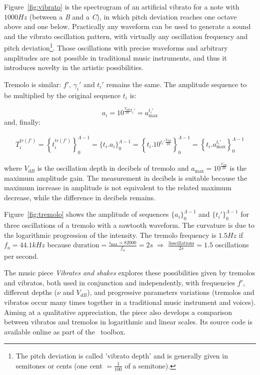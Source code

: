 Figure~\ref{fig:vibrato} is the spectrogram of an artificial vibrato for a note with $1000Hz$ (between a \emph{B} and a \emph{C}), in which pitch deviation reaches one octave above and one below. Practically any waveform can be used to generate a sound and the vibrato oscillation pattern, with virtually any oscillation frequency and pitch deviation\footnote{The pitch deviation is called 'vibrato depth' and is generally given in semitones or cents (one cent $= \frac{1}{100}$ of a semitone).}.
Those oscillations with precise waveforms and arbitrary amplitudes are not possible in traditional music instruments, and thus it introduces novelty in the artistic possibilities.

Tremolo is similar: $f'$, $\gamma_i'$ and $t_i'$ remains the same.
The amplitude sequence to be multiplied by the original sequence $t_i$ is:

\begin{equation}\label{trA}
 a_i=10^{\frac{V_{dB}}{20}t_i' } = a_{\text{max}}^{t_i'}
\end{equation}
\noindent and, finally: 

\begin{equation}\label{trT}
\begin{split}
 T_i^{tr(f')}=\left \{ t_i^{tr(f')} \right \}_0^{\Lambda-1}=\{ t_i . a_i \}_0^{\Lambda-1}= \left \{t_i .10^{t_i' \frac{V_{dB}}{20}}    \right \}_0^{\Lambda-1}=\left\{t_i . a_{\text{max}}^{t_i'} \right\}_0^{\Lambda-1}
\end{split}
\end{equation}

\noindent where $V_{dB}$ is the oscillation depth in decibels of tremolo and $a_{\text{max}}=10^{\frac{V_{dB}}{20}}$ is the maximum amplitude gain. The measurement in decibels is suitable because the maximum increase in amplitude is not equivalent to the related maximum decrease, while the difference in decibels remains.

Figure~\ref{fig:tremolo} shows the amplitude of sequences $\{a_i\}_0^{\Lambda-1}$ and $\{t_i'\}_0^{\Lambda-1}$ for three oscillations of a tremolo with a sawtooth waveform. The curvature is due to the logarithmic progression of the intensity. The tremolo frequency is $1.5Hz$ if $f_a=44.1kHz$ because $\text{duration} = \frac{i_{\text{max}}=82000}{f_a}= 2s \; \Rightarrow \; \frac{3\text{oscillations}}{2s}=1.5$ oscillations per second.

The music piece \emph{Vibrates and shakes} explores these possibilities given by tremolos and vibratos, both used in conjunction and independently, with frequencies $f'$, different depths ($\nu$ and $V_{dB}$), and progressive parameters variations (tremolos and vibratos occur many times together in a traditional music instrument and voices). Aiming at a qualitative appreciation, the piece also develops a comparison between vibratos and tremolos in logarithmic and linear scales. Its source code is available online as part of the \massa\ toolbox.

